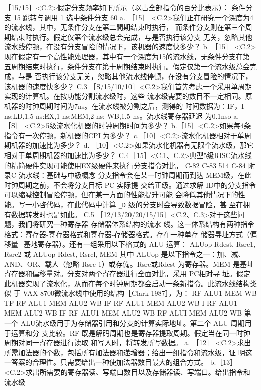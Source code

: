 ［15/15］<C.2>假定分支频率如下所示（以占全部指令的百分比表示）：
条件分支
15%
跳转与调用
1%
选中条件分支
60%
a. ［15］ <C.2>我们正在研究一个深度为4的流水线，其中，无条件分支在第二間期结東时执行，
而条件分支则在第三个周期结束时执行。假定仅第个流水级总会完成，与是否执行该分支
无关，忽略其他流水线停顿，在没有分支冒险的情况下，该机器的速度快多少？
b. ［15］ <C.2>现在假定有一个高性能处理器，其中有一个深度为15的流水线，无条件分支在第
五周期结束时执行，条件分支在第十周期结束时执行。假定仅第一个流水级总会完成，与是
否执行该分支无关，忽略其他流水线停顿，在没有分支冒险的情况下，该机器的速度快多少？
C.3
［S/15/10/10］<C.2>我们首先考虑一个采用单周期实现的计算机。在按功能分割流水级时，这些
流水级需要的数目不一定相同。原机器的时钟周期时间为7ns。在流水线被分割之后，测得的
时间数据为：IF，I ns;LD,1.5 ns:EX,1 ns;MEM,2 ns; WB,1.5 ns。流水线寄存器延迟
为0.1nso
a. ［S］ <C.2>5级流水化机器的时钟周期时间为多少？
b.［15］<C.2>如果每4条指令有一次停顿，新机器的CPI 为多少？
c.［10］<C.2>流水化机器相对于单周期机器的加速比为多少？
d. ［10］<C.2>如果流水化机器有无限个流水级，那它相对于单周期机器的加速比为多少？
C.4［15］<C.1、C.2>典型5级RISC流水线的精简硬件实现可能使用EX级硬件来执行分支措令对比，
C-82
C-83
514
C-84
附录C 流水线：基础与中級概念
分支指令会在某一时钟周期而到达 MEM级，在此时钟周期之前，不会将分支目标 PC 实际提
交给正级。通过求解 ID中的分支指令可以缩减控制冒险停顿，但在某一方面的性能提升可能
会降低其他情况下的性能。写一小啓代码，在此代码中计算 \verb|_D| 级的分支时会导致数据冒险，甚
至在拥有数据转发时也是如此。
C.5
［12/13/20/20/15/15］<C.2、C.3>对于这些问题，我们将研究一种寄存器-存储器体系结构的流水
线。这一体系结构有两种指令格式：寄存器-寄存器格式和寄存器-存储器格式。存在一种单存
储器寻址方式（偏移量+基地寄存器）。还有一组采用以下格式的 ALU 运算：
ALUop Rdest, Rsrc1, Rsrc2
或
ALUop Rdest, Rsrcl, MEM
其中 ALUop 是以下指令之一：加、减、AND、OR、载人（忽略 Rsrc 1）或存備。Rsrc或Rdest
为寄存器。MEM 是基址寄存器和偏移量对。分支对两个寄存器进行全面对比，采用 PC相对寻
址。假定此机器实现了流水化，从而在每个时钟周期都会启动一条新措令。此流水线结构类似
于 VAX 8700微流水线中使用的结构［Clark 1987］，为：
RF ALU1 MEM WB
TF
RF ALU1 MEM ALU2 WB
IF
RF
ALU1 MEM
ALU2
WB
I
RF
ALU1
MEM
ALU2 WB
IF
RF
ALU1 MEM ALU2 WB
RF
ALUI MEM ALU2 WB
第一个 ALU流水级用于为存储器引用和分支的计算实际地址。第二个 ALU 周期用于运算和分
支比较。RF 既是解码周期也是寄存器提取周期。假定当在同一时钟周期对同一寄存器进行读取
和写人时，将转发所写数据。
a. ［12］ <C.2>求出所需加法器的个数，包括所有加法器和递增器；给出一组指令和流水级，证
明这一答案的合理性。只需要给出一种使加法器数目最大的组合方式。
b.［13］ <C.2>求出所需要的寄存器读、写端口数目以及存储器读、写端口。给出指令和流水级
